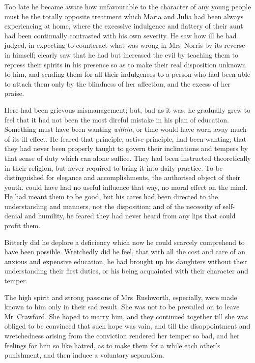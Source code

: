 Too late he became aware how unfavourable to the character of any young people must be the totally opposite treatment which Maria and Julia had been always experiencing at home, where the excessive indulgence and flattery of their aunt had been continually contrasted with his own severity. He saw how ill he had judged, in expecting to counteract what was wrong in Mrs~Norris by its reverse in himself; clearly saw that he had but increased the evil by teaching them to repress their spirits in his presence so as to make their real disposition unknown to him, and sending them for all their indulgences to a person who had been able to attach them only by the blindness of her affection, and the excess of her praise.

Here had been grievous mismanagement; but, bad as it was, he gradually grew to feel that it had not been the most direful mistake in his plan of education. Something must have been wanting \textit{within}, or time would have worn away much of its ill effect. He feared that principle, active principle, had been wanting; that they had never been properly taught to govern their inclinations and tempers by that sense of duty which can alone suffice. They had been instructed theoretically in their religion, but never required to bring it into daily practice. To be distinguished for elegance and accomplishments, the authorised object of their youth, could have had no useful influence that way, no moral effect on the mind. He had meant them to be good, but his cares had been directed to the understanding and manners, not the disposition; and of the necessity of self-denial and humility, he feared they had never heard from any lips that could profit them.

Bitterly did he deplore a deficiency which now he could scarcely comprehend to have been possible. Wretchedly did he feel, that with all the cost and care of an anxious and expensive education, he had brought up his daughters without their understanding their first duties, or his being acquainted with their character and temper.

The high spirit and strong passions of Mrs~Rushworth, especially, were made known to him only in their sad result. She was not to be prevailed on to leave Mr~Crawford. She hoped to marry him, and they continued together till she was obliged to be convinced that such hope was vain, and till the disappointment and wretchedness arising from the conviction rendered her temper so bad, and her feelings for him so like hatred, as to make them for a while each other's punishment, and then induce a voluntary separation.


